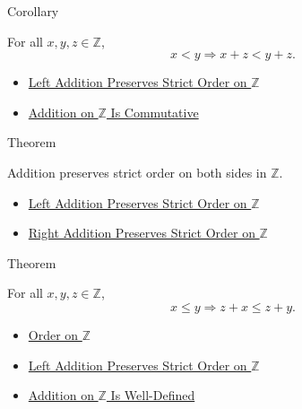 \begin{corollarybox}{Corollary}
\begin{corollary}
\label{cor:right-addition-preserves-strict-order-on-z}
For all $x,y,z\in\mathbb{Z}$,
\[
x<y \Longrightarrow x+z<y+z.
\]
\end{corollary}
\end{corollarybox}

\begin{dependencies}
\begin{itemize}
  \item \hyperref[thm:left-addition-preserves-strict-order-on-z]{Left Addition Preserves Strict Order on $\mathbb{Z}$}
  \item \hyperref[thm:addition-on-z-commutative]{Addition on $\mathbb{Z}$ Is Commutative}
\end{itemize}
\end{dependencies}

\begin{theorembox}{Theorem}
\begin{theorem}
\label{thm:addition-preserves-strict-order-on-z}
Addition preserves strict order on both sides in $\mathbb{Z}$.
\end{theorem}
\end{theorembox}

\begin{dependencies}
\begin{itemize}
  \item \hyperref[thm:left-addition-preserves-strict-order-on-z]{Left Addition Preserves Strict Order on $\mathbb{Z}$}
  \item \hyperref[cor:right-addition-preserves-strict-order-on-z]{Right Addition Preserves Strict Order on $\mathbb{Z}$}
\end{itemize}
\end{dependencies}

\begin{theorembox}{Theorem}
\begin{theorem}
\label{thm:left-addition-preserves-order-on-z}
For all $x,y,z\in\mathbb{Z}$,
\[
x\le y \Longrightarrow z+x\le z+y.
\]
\end{theorem}
\end{theorembox}

\begin{dependencies}
\begin{itemize}
  \item \hyperref[def:order-on-z]{Order on $\mathbb{Z}$}
  \item \hyperref[thm:left-addition-preserves-strict-order-on-z]{Left Addition Preserves Strict Order on $\mathbb{Z}$}
  \item \hyperref[thm:addition-on-z-well-defined]{Addition on $\mathbb{Z}$ Is Well-Defined}
\end{itemize}
\end{dependencies}

